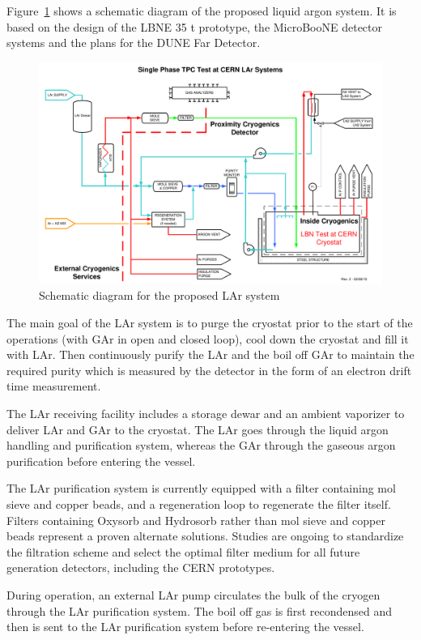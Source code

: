 Figure~\ref{fig:proposed-LAr-system} shows a schematic diagram of the proposed liquid argon system. It is based on the design of the 
LBNE 35 t prototype, the MicroBooNE detector systems and the plans for the DUNE Far Detector.
\begin{figure}
\begin{center}
\includegraphics[width=1.0\textwidth]{figures/proposed-LAr-system} 
\caption[Schematic diagram for the proposed LAr system]{\label{fig:proposed-LAr-system} Schematic diagram for the proposed LAr system}
\end{center}
\end{figure}
The main goal of the LAr system is to purge the cryostat prior to the start of the operations (with GAr in open 
and closed loop), cool down the cryostat and fill it with LAr. Then continuously purify the LAr and the boil 
off GAr to maintain the required purity which is measured by the detector in the form of an electron drift time measurement.

The LAr receiving facility includes a storage dewar and an ambient vaporizer to deliver LAr and GAr to the 
cryostat. The LAr goes through the liquid argon handling and purification system, whereas the GAr 
through the gaseous argon purification before entering the vessel.

The LAr purification system is currently equipped with a filter containing mol sieve and copper beads, and 
a regeneration loop to regenerate the filter itself. Filters containing Oxysorb and Hydrosorb rather than 
mol sieve and copper beads represent a proven alternate solutions.
Studies are ongoing to standardize the filtration scheme and select the optimal filter medium for all 
future generation detectors, including the CERN prototypes. 

During operation, an external LAr pump circulates the bulk of the cryogen through the LAr purification 
system. The boil off gas is first recondensed and then is sent to the LAr purification system before 
re-entering the vessel.




